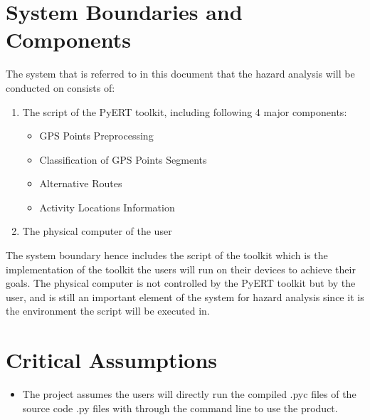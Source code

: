 \documentclass{article}
\begin{document}
\section{System Boundaries and Components}
The system that is referred to in this document that the hazard analysis will be conducted on consists of:
\begin{enumerate}
    \item The script of the PyERT toolkit, including following 4 major components:
        \begin{itemize}
            \item GPS Points Preprocessing
            \item Classification of GPS Points Segments
            \item Alternative Routes 
            \item Activity Locations Information
        \end{itemize}
    \item The physical computer of the user
\end{enumerate}
The system boundary hence includes the script of the toolkit which is the implementation of the toolkit the users will run on their devices to achieve their goals. The physical computer is not controlled by the PyERT toolkit but by the user, and is still an important element of the system for hazard analysis since it is the environment the script will be executed in.

\section{Critical Assumptions}
\begin{itemize}
    \item The project assumes the users will directly run the compiled .pyc files of the source code .py files with through the command line to use the product.
\end{itemize}
\begin{comment}
\wss{These assumptions that are made about the software or system.  You should
minimize the number of assumptions that remove potential hazards.  For instance,
you could assume a part will never fail, but it is generally better to include
this potential failure mode.}
\end{comment}
\end{document}
